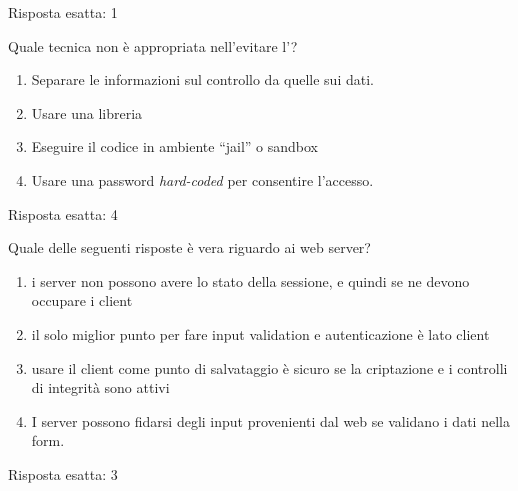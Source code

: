 \begin{Answer} [
  ref={esControlli2},
  number={2}
  ]

  \Question Risposta esatta: 1
\end{Answer}

\begin{Exercise} [
  title={Quiz},
  label={esControlli3}
  ]

  \Question Quale tecnica non è appropriata nell'evitare
  l'?
\begin{enumerate}
\item Separare le informazioni sul controllo da quelle sui dati.
\item Usare una libreria
\item Eseguire il codice in ambiente ``jail'' o sandbox
\item Usare una password \textit{hard-coded} per consentire l'accesso.
\end{enumerate}
 

\end{Exercise}

\begin{Answer} [
  ref={esControlli3},
  number={3}
  ]

  \Question Risposta esatta: 4
\end{Answer}


\begin{Exercise} [
  title={Quiz},
  label={esControlli4}
  ]

  \Question Quale delle seguenti risposte è vera riguardo ai web server?
  \begin{enumerate}
   \item i server non possono avere lo stato della sessione, e quindi se ne 
devono occupare i client
   \item il solo miglior punto per fare input validation e autenticazione è 
lato client
   \item usare il client come punto di salvataggio è sicuro se la criptazione 
e i controlli di integrità sono attivi
   \item I server possono fidarsi degli input provenienti dal web se validano i 
dati nella form.
  \end{enumerate}
\end{Exercise}

\begin{Answer} [
  ref={esControlli4},
  number={4}
  ]

  \Question Risposta esatta: 3
\end{Answer}

